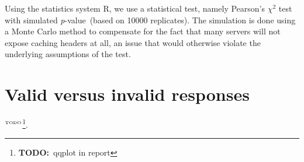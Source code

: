 \documentclass{article}
\newcommand{\pvalue}{\textit{p}-value\ }
\newcommand{\todo}[1]{\ensuremath{^{\textrm{\tiny{TODO}\normalsize}}}\footnote{\textbf{TODO:}~#1}}
\begin{document}
Using the statistics system R\cite{kn:r}, we use a statistical test,
namely Pearson's $\chi^2$ test with simulated \pvalue (based on 10000
replicates). The simulation is done using a Monte Carlo method to
compensate for the fact that many servers will not expose caching
headers at all, an issue that would otherwise violate the underlying
assumptions of the test.

\section{Valid versus invalid responses}\label{app:qqplot}

		
\todo{qqplot in report}.


%

%
%

\end{document}

